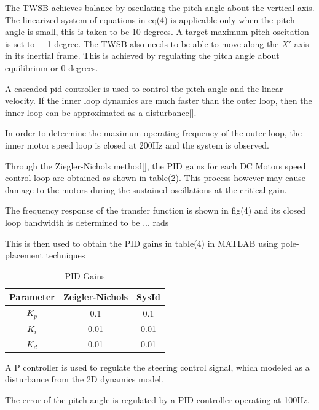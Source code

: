         The TWSB achieves balance by osculating the pitch angle about the vertical axis. 
        The linearized system of equations in eq(4) is applicable 
        only when the pitch angle is small, this is taken to be 10 degrees. 
        A target maximum pitch oscitation is set to +-1 degree. 
        The TWSB also needs to be able to move along the $X'$ axis in its inertial frame.
        This is achieved by regulating the pitch angle about equilibrium or 0 degrees.

        A cascaded pid controller is used to control the pitch angle and the linear velocity. 
        If the inner loop dynamics are much faster than the outer loop, 
        then the inner loop can be approximated as a disturbance[].

        In order to determine the maximum operating frequency of the outer loop, 
        the inner motor speed loop is closed at 200Hz and the system is observed.
        
        Through the Ziegler-Nichols method[], the PID gains for each DC Motors speed control loop 
        are obtained as shown in table(2). This process however may cause damage to the motors 
        during the sustained oscillations at the critical gain. 
       
        The frequency response of the transfer function is shown in fig(4) 
        and its closed loop bandwidth is determined to be ... rads

        This is then used to obtain the PID gains in table(4) in MATLAB using pole-placement techniques
        \begin{table}[H]
            \centering
            \begin{tabular}{|c|c|c|}
                \hline
                Parameter & Zeigler-Nichols & SysId \\
                \hline 
                $K_p$ & 0.1 & 0.1 \\
                $K_i$ & 0.01 & 0.01 \\
                $K_d$ & 0.01 & 0.01 \\
                \hline
            \end{tabular}
            \caption{PID Gains}
        \end{table}

        A P controller is used to regulate the steering control signal, which modeled
        as a disturbance from the 2D dynamics model.

        The error of the pitch angle is regulated by a PID controller operating at 100Hz. 
        
